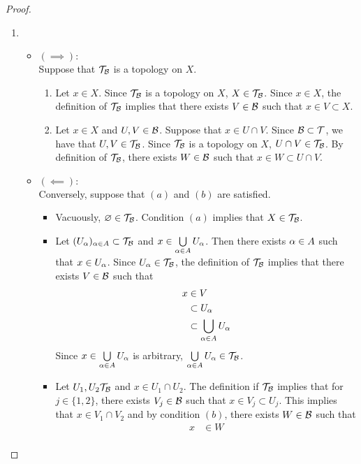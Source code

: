 \documentclass{book}
\begin{document}
	\begin{proof} \
	\begin{enumerate}
		\item \begin{itemize}
			\item $(\implies): $ \\
			Suppose that $\mathcal{T}_{\mathcal{B}}$ is a topology on $X$. 
			\begin{enumerate}
				\item Let $x \in X$. Since $\mathcal{T}_{\mathcal{B}}$ is a topology on $X$, $X \in \mathcal{T}_{\mathcal{B}}$. Since $x \in X$, the definition of $\mathcal{T}_{\mathcal{B}}$ implies that there exists $V \in \mathcal{B}$ such that $x \in V \subset X$. 
				\item Let $x \in X$ and $U,V \in \mathcal{B}$. Suppose that $x \in U \cap V$. Since $\mathcal{B} \subset \mathcal{T}$, we have that $U,V \in \mathcal{T}_{\mathcal{B}}$. Since $\mathcal{T}_{\mathcal{B}}$ is a topology on $X$, $U \cap V \in \mathcal{T}_{\mathcal{B}}$. By definition of $\mathcal{T}_{\mathcal{B}}$, there exists $W \in \mathcal{B}$ such that $x \in W \subset U \cap V$.
			\end{enumerate}
			\item $(\impliedby): $ \\
			Conversely, suppose that $(a)$ and $(b)$ are satisfied. 
			\begin{itemize}
				\item Vacuously, $\varnothing \in \mathcal{T}_{\mathcal{B}}$. Condition $(a)$ implies that $X \in \mathcal{T}_{\mathcal{B}}$. 
				\item Let $(U_{\alpha})_{\alpha \in A} \subset \mathcal{T}_{\mathcal{B}}$ and $x \in \bigcup\limits_{\alpha \in A}U_{\alpha}$. Then there exists $\alpha \in A$ such that $x \in U_{\alpha}$. Since $U_{\alpha} \in \mathcal{T}_{\mathcal{B}}$, the definition of $\mathcal{T}_{\mathcal{B}}$ implies that there exists $V \in \mathcal{B}$ such that
				\begin{align*}
					x 
					& \in V \\
					& \subset U_{\alpha} \\
					& \subset \bigcup\limits_{\alpha \in A}U_{\alpha}
				\end{align*}
				Since $x \in \bigcup\limits_{\alpha \in A}U_{\alpha}$ is arbitrary, $\bigcup\limits_{\alpha \in A}U_{\alpha} \in \mathcal{T}_{\mathcal{B}}$. 
				\item Let $U_1, U_2 \mathcal{T}_{\mathcal{B}}$ and $x \in U_1 \cap U_2$. The definition if $\mathcal{T}_{\mathcal{B}}$ implies that for $j \in \{1, 2\}$, there exists $V_j \in \mathcal{B}$ such that $x \in V_j \subset U_j$. This implies that $x \in V_1 \cap V_2$ and by condition $(b)$, there exists $W \in \mathcal{B}$ such that
				\begin{align*}
					x 
					& \in W \\

\end{align*}
\end{itemize}
\end{itemize}
\end{enumerate}
\end{proof}
\end{document}
